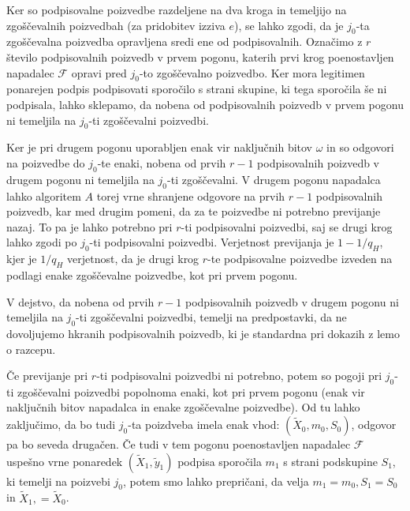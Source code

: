 \documentclass[isrm2, tisk]{fmfdelo}
\begin{document}
Ker so podpisovalne poizvedbe razdeljene na dva kroga in temeljijo na zgoščevalnih poizvedbah (za
pridobitev izziva $e$), se lahko zgodi, da je $j_0$-ta zgoščevalna poizvedba opravljena sredi ene
od podpisovalnih. Označimo z $r$ število podpisovalnih poizvedb v prvem pogonu, katerih prvi krog
poenostavljen napadalec $\mathcal{F}$ opravi pred $j_0$-to zgoščevalno poizvedbo. Ker mora legitimen
ponarejen podpis podpisovati sporočilo s strani skupine, ki tega sporočila še ni podpisala, lahko
sklepamo, da nobena od podpisovalnih poizvedb v prvem pogonu ni temeljila na $j_0$-ti zgoščevalni
poizvedbi.

Ker je pri drugem pogonu uporabljen enak vir naključnih bitov $\omega$ in so odgovori na poizvedbe do
$j_0$-te enaki, nobena od prvih $r - 1$ podpisovalnih poizvedb v drugem pogonu ni temeljila na $j_0$-ti
zgoščevalni. V drugem pogonu napadalca lahko algoritem $A$ torej vrne shranjene odgovore na prvih
$r - 1$ podpisovalnih poizvedb, kar med drugim pomeni, da za te poizvedbe ni potrebno previjanje
nazaj. To pa je lahko potrebno pri $r$-ti podpisovalni poizvedbi, saj se drugi krog lahko zgodi po
$j_0$-ti podpisovalni poizvedbi. Verjetnost previjanja je $1 - 1/q_H$, kjer je $1/q_H$ verjetnost,
da je drugi krog $r$-te podpisovalne poizvedbe izveden na podlagi enake zgoščevalne poizvedbe, kot
pri prvem pogonu.

\begin{opomba}
    V dejstvo, da nobena od prvih $r - 1$ podpisovalnih poizvedb v drugem pogonu ni temeljila na
    $j_0$-ti zgoščevalni poizvedbi, temelji na predpostavki, da ne dovoljujemo hkranih podpisovalnih
    poizvedb, ki je standardna pri dokazih z lemo o razcepu.
\end{opomba}

Če previjanje pri $r$-ti podpisovalni poizvedbi ni potrebno, potem so pogoji pri $j_0$-ti zgoščevalni
poizvedbi popolnoma enaki, kot pri prvem pogonu (enak vir naključnih bitov napadalca in enake
zgoščevalne poizvedbe). Od tu lahko zaključimo, da bo tudi $j_0$-ta poizdveba imela enak vhod:
$(\tilde{X}_0, m_0, S_0)$, odgovor pa bo seveda drugačen. Če tudi v tem pogonu poenostavljen napadalec
$\mathcal{F}$ uspešno vrne ponaredek $(\tilde{X}_1, \tilde{y}_1)$ podpisa sporočila $m_1$ s strani
podskupine $S_1$, ki temelji na poizvebi $j_0$, potem smo lahko prepričani, da velja $m_1 = m_0,
S_1 = S_0$ in $\tilde{X}_1, = \tilde{X}_0$.
\end{document}

